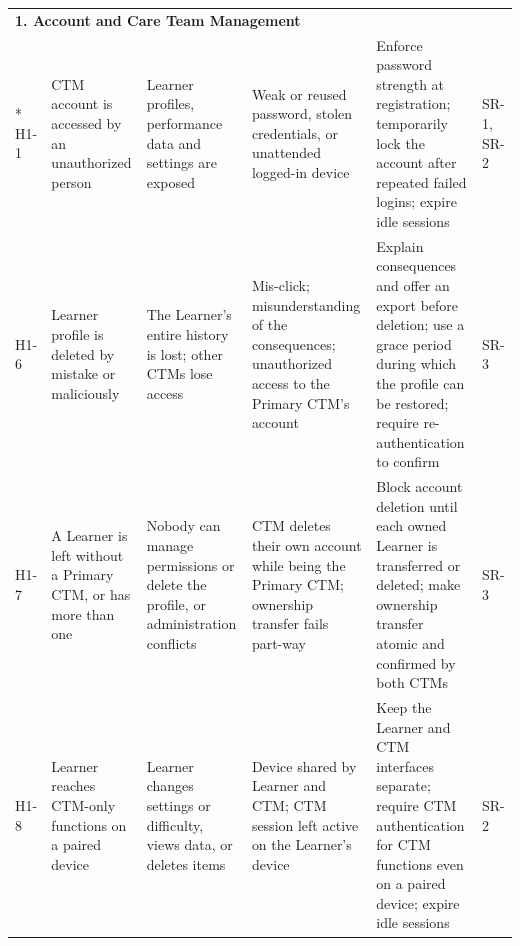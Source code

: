 \documentclass{article}
\begin{document}
\begin{landscape}
\begin{longtable}{p{1.0cm} p{3.1cm} p{3.9cm} p{3.9cm} p{5.2cm} p{2.5cm}}
\multicolumn{6}{l}{\textbf{1. Account and Care Team Management}}\\*
\midrule
H1-1 & CTM account is accessed by an unauthorized person &
Learner profiles, performance data and settings are exposed &
Weak or reused password, stolen credentials, or unattended logged-in device &
Enforce password strength at registration; temporarily lock the account after repeated failed logins; expire idle sessions &
SR-1, SR-2\\
\midrule
H1-6 & Learner profile is deleted by mistake or maliciously &
The Learner's entire history is lost; other CTMs lose access &
Mis-click; misunderstanding of the consequences; unauthorized access to the Primary CTM's account &
Explain consequences and offer an export before deletion; use a grace period during which the profile can be restored; require re-authentication to confirm &
SR-3\\
\midrule
H1-7 & A Learner is left without a Primary CTM, or has more than one &
Nobody can manage permissions or delete the profile, or administration conflicts &
CTM deletes their own account while being the Primary CTM; ownership transfer fails part-way &
Block account deletion until each owned Learner is transferred or deleted; make ownership transfer atomic and confirmed by both CTMs &
SR-3\\
\midrule
H1-8 & Learner reaches CTM-only functions on a paired device &
Learner changes settings or difficulty, views data, or deletes items&
Device shared by Learner and CTM; CTM session left active on the Learner's device &
Keep the Learner and CTM interfaces separate; require CTM authentication for CTM functions even on a paired device; expire idle sessions &
SR-2\\
\midrule


\end{longtable}
\end{landscape}
\end{document}
